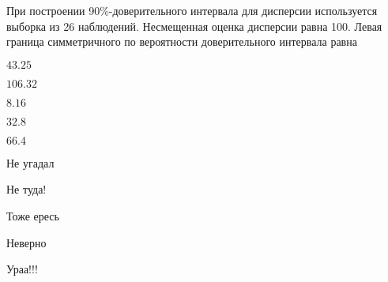 
\begin{question}
При построении 90\%-доверительного интервала для дисперсии используется
выборка из 26 наблюдений. Несмещенная оценка дисперсии равна 100. Левая
граница симметричного по вероятности доверительного интервала равна
\begin{answerlist}
  \item \(43.25\)
  \item \(106.32\)
  \item \(8.16\)
  \item \(32.8\)
  \item \(66.4\)
\end{answerlist}
\end{question}

\begin{solution}
\begin{answerlist}
  \item Не угадал
  \item Не туда!
  \item Тоже ересь
  \item Неверно
  \item Ураа!!!
\end{answerlist}
\end{solution}

